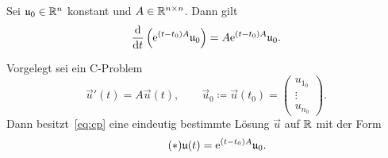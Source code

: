 \begin{corollary}\label{thm:matrixexp-derivative-corollary}
    Sei $\mathfrak{u}_0 \in \mathbb{R}^n$ konstant und $A \in \mathbb{R}^{n \times n}$.
    Dann gilt
    \begin{equation*}
        \frac{\mathrm{d} }{\mathrm{d} t} \left( \mathrm{e}^{(t - t_0) A} \mathfrak{u}_0 \right) = A \mathrm{e}^{(t - t_0) A} \mathfrak{u}_0.
    \end{equation*}
\end{corollary}

\begin{theorem}\label{thm:existenz-eindeutigkeit}
    Vorgelegt sei ein C-Problem
    \begin{equation}\tag{CP}\label{eq:cp}
        \vec{u}'(t) = A \vec{u}(t), \qquad \vec{u}_0 \coloneqq \vec{u}(t_0) = \begin{pmatrix} u_{1_0}\\ \vdots\\ u_{n_0} \end{pmatrix}.
    \end{equation}
    Dann besitzt~\eqref{eq:cp} eine eindeutig bestimmte Lösung $\vec{u}$ auf $\mathbb{R}$ mit der Form
    \begin{equation}\tag{$\ast$}\label{eq:solution}
        \mathfrak{u}(t) = \mathrm{e}^{(t - t_0) A} \mathfrak{u}_0.
    \end{equation}
\end{theorem}

